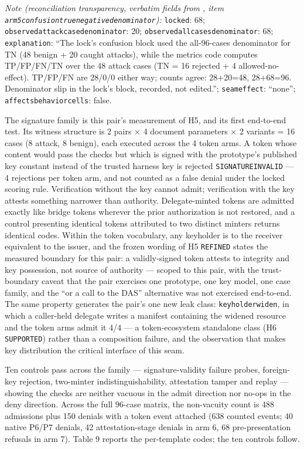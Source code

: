 \documentclass[
  10pt,
]{article}
\newcounter{none} %
\renewcommand{\_}{\origunderscore\allowbreak}
\begin{document}
\emph{Note (reconciliation transparency, verbatim fields from
,
item \texttt{arm5\_confusion\_true\_negative\_denominator}):}
\texttt{locked}: 68; \texttt{observed\_attack\_case\_denominator}: 20;
\texttt{observed\_all\_cases\_denominator}: 68; \texttt{explanation}:
``The lock's confusion block used the all-96-cases denominator for TN
(48 benign + 20 caught attacks), while the metrics code computes
TP/FP/FN/TN over the 48 attack cases (TN = 16 rejected + 4
allowed-no-effect). TP/FP/FN are 28/0/0 either way; counts agree:
28+20=48, 28+68=96. Denominator slip in the lock's block, recorded, not
edited.''; \texttt{seam\_effect}: ``none'';
\texttt{affects\_behavior\_cells}: false.

The signature family is this pair's measurement of H5, and its first
end-to-end test. Its witness structure is 2 pairs × 4 document
parameters × 2 variants = 16 cases (8 attack, 8 benign), each executed
across the 4 token arms. A token whose content would pass the checks but
which is signed with the prototype's published key constant instead of
the trusted harness key is rejected \texttt{SIGNATURE\_INVALID} --- 4
rejections per token arm, and not counted as a false denial under the
locked scoring rule. Verification without the key cannot admit;
verification with the key attests something narrower than authority.
Delegate-minted tokens are admitted exactly like bridge tokens wherever
the prior authorization is not restored, and a control presenting
identical tokens attributed to two distinct minters returns identical
codes. Within the token vocabulary, any keyholder is to the receiver
equivalent to the issuer, and the frozen wording of H5 \texttt{REFINED}
states the measured boundary for this pair: a validly-signed token
attests to integrity and key possession, not source of authority ---
scoped to this pair, with the trust-boundary caveat that the pair
exercises one prototype, one key model, one case family, and the ``or a
call to the DAS'' alternative was not exercised end-to-end. The same
property generates the pair's one new leak class:
\texttt{keyholder\_widen}, in which a caller-held delegate writes a
manifest containing the widened resource and the token arms admit it 4/4
--- a token-ecosystem standalone class (H6 \texttt{SUPPORTED}) rather
than a composition failure, and the observation that makes key
distribution the critical interface of this seam.

Ten controls pass across the family --- signature-validity failure
probes, foreign-key rejection, two-minter indistinguishability,
attestation tamper and replay --- showing the checks are neither vacuous
in the admit direction nor no-ops in the deny direction. Across the full
96-case matrix, the non-vacuity count is 488 admissions plus 150 denials
with a token event attached (638 counted events; 40 native P6/P7
denials, 42 attestation-stage denials in arm 6, 68 pre-presentation
refusals in arm 7). Table 9 reports the per-template codes; the ten
controls follow.
\end{document}

